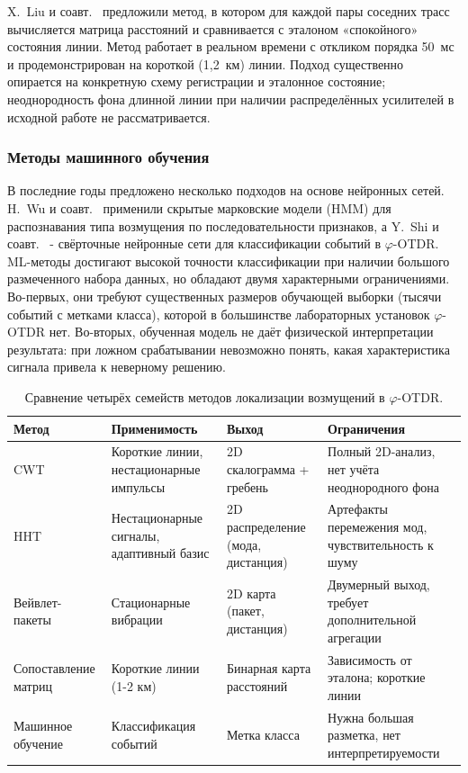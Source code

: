 \documentclass[12pt,a4paper]{extarticle}
\newcommand{\phiOTDR}{$\varphi$-OTDR}
\begin{document}
X.~Liu и соавт.~\cite{Liu2018} предложили метод, в котором для каждой пары соседних трасс вычисляется матрица расстояний и сравнивается с эталоном «спокойного» состояния линии. Метод работает в реальном времени с откликом порядка 50~мс и продемонстрирован на короткой (1{,}2~км) линии. Подход существенно опирается на конкретную схему регистрации и эталонное состояние; неоднородность фона длинной линии при наличии распределённых усилителей в исходной работе не рассматривается.

\subsubsection*{Методы машинного обучения}

В последние годы предложено несколько подходов на основе нейронных сетей. H.~Wu и соавт.~\cite{Wu2019} применили скрытые марковские модели (HMM) для распознавания типа возмущения по последовательности признаков, а Y.~Shi и соавт.~\cite{Shi2020} - свёрточные нейронные сети для классификации событий в \phiOTDR. ML-методы достигают высокой точности классификации при наличии большого размеченного набора данных, но обладают двумя характерными ограничениями. Во-первых, они требуют существенных размеров обучающей выборки (тысячи событий с метками класса), которой в большинстве лабораторных установок \phiOTDR{} нет. Во-вторых, обученная модель не даёт физической интерпретации результата: при ложном срабатывании невозможно понять, какая характеристика сигнала привела к неверному решению.

\begin{table}[h]
\caption{Сравнение четырёх семейств методов локализации возмущений в \phiOTDR.}
\label{tab:methods}
\centering
\renewcommand{\arraystretch}{1.25}
\begin{tabular}{p{3.4cm} p{3.6cm} p{3.4cm} p{3.5cm}}
\toprule
\textbf{Метод} & \textbf{Применимость} & \textbf{Выход} & \textbf{Ограничения} \\
\midrule
CWT~\cite{Qin2012} & Короткие линии, нестационарные импульсы & 2D скалограмма + гребень & Полный 2D-анализ, нет учёта неоднородного фона \\
HHT~\cite{Hui2014} & Нестационарные сигналы, адаптивный базис & 2D распределение (мода, дистанция) & Артефакты перемежения мод, чувствительность к шуму \\
Вейвлет-пакеты~\cite{Li2014} & Стационарные вибрации & 2D карта (пакет, дистанция) & Двумерный выход, требует дополнительной агрегации \\
Сопоставление матриц~\cite{Liu2018} & Короткие линии (1-2 км) & Бинарная карта расстояний & Зависимость от эталона; короткие линии \\
Машинное обучение~\cite{Wu2019, Shi2020} & Классификация событий & Метка класса & Нужна большая разметка, нет интерпретируемости \\
\bottomrule
\end{tabular}
\end{table}
\end{document}
